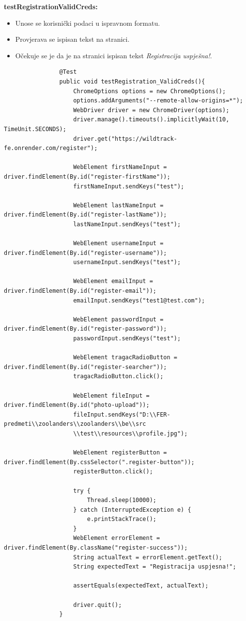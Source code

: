 			\textbf{testRegistrationValidCreds:}
			\begin{itemize}
				\item Unose se korisnički podaci u ispravnom formatu.
				\item Provjerava se ispisan tekst na stranici.
				\item Očekuje se je da je na stranici ispisan tekst \textit{Registracija uspješna!}.
			\end{itemize}
			\begin{lstlisting}
				@Test
				public void testRegistration_ValidCreds(){
					ChromeOptions options = new ChromeOptions();
					options.addArguments("--remote-allow-origins=*");
					WebDriver driver = new ChromeDriver(options);
					driver.manage().timeouts().implicitlyWait(10, TimeUnit.SECONDS);
					driver.get("https://wildtrack-fe.onrender.com/register");
					
					WebElement firstNameInput = driver.findElement(By.id("register-firstName"));
					firstNameInput.sendKeys("test");
					
					WebElement lastNameInput = driver.findElement(By.id("register-lastName"));
					lastNameInput.sendKeys("test");
					
					WebElement usernameInput = driver.findElement(By.id("register-username"));
					usernameInput.sendKeys("test");
					
					WebElement emailInput = driver.findElement(By.id("register-email"));
					emailInput.sendKeys("test1@test.com");
					
					WebElement passwordInput = driver.findElement(By.id("register-password"));
					passwordInput.sendKeys("test");
					
					WebElement tragacRadioButton = driver.findElement(By.id("register-searcher"));
					tragacRadioButton.click();
					
					WebElement fileInput = driver.findElement(By.id("photo-upload"));
					fileInput.sendKeys("D:\\FER-predmeti\\zoolanders\\zoolanders\\be\\src
					\\test\\resources\\profile.jpg");
					
					WebElement registerButton = driver.findElement(By.cssSelector(".register-button"));
					registerButton.click();
					
					try {
						Thread.sleep(10000);
					} catch (InterruptedException e) {
						e.printStackTrace();
					}
					WebElement errorElement = driver.findElement(By.className("register-success"));
					String actualText = errorElement.getText();
 					String expectedText = "Registracija uspjesna!";
					
					assertEquals(expectedText, actualText);
					
					driver.quit();
				}
			\end{lstlisting}
			
